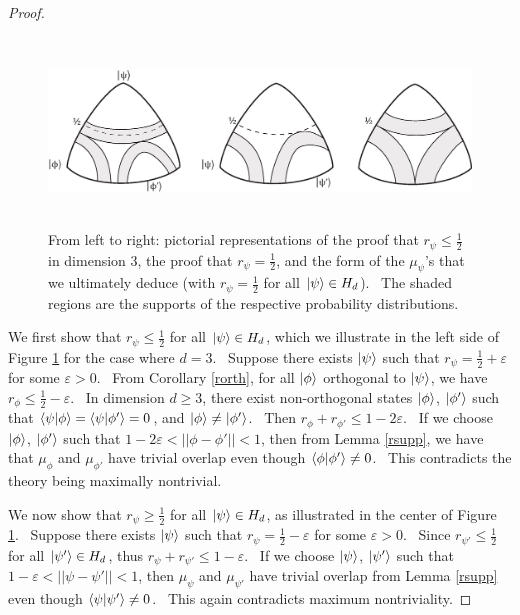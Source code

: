 \documentclass[letterpaper,11pt]{article}
\newcommand{\braket}[2]{\mbox{$ \langle #1 | #2 \rangle $}}
\newcommand{\ket}[1]{\mbox{$ | #1 \rangle $}}
\begin{document}
\begin{proof}
\begin{figure}[h] \centering
\includegraphics[height=5cm]{figlemma5}
\caption{From left to right: pictorial representations of the proof that $r_{\psi}\leq\frac{1}{2}$ in dimension $3$, the proof that $r_{\psi}=\frac{1}{2}$, and the form of the $\mu_{\psi}$'s that we ultimately deduce (with $r_{\psi}=\frac{1}{2}$ for all $\ket{\psi}\in H_d$). \ The shaded regions are the supports of the respective probability distributions.} \label{figlemma5}
\end{figure}
We first show that $r_{\psi}\leq \frac{1}{2}$ for all $\ket{\psi}\in H_d$, which we illustrate in the left side of Figure \ref{figlemma5} for the case where $d=3$. \ Suppose there exists $\ket{\psi}$ such that $r_{\psi}=\frac{1}{2}+\varepsilon$ for some $\varepsilon>0$. \ From Corollary \ref{rorth}, for all $\ket{\phi}$ orthogonal to $\ket{\psi}$, we have $r_{\phi}\leq \frac{1}{2}-\varepsilon$. \ In dimension $d\geq 3$, there exist non-orthogonal states $\ket{\phi}$, $\ket{\phi'}$ such that $\braket{\psi}{\phi}=\braket{\psi}{\phi'}=0$, and $\ket{\phi}\neq\ket{\phi'}$. \ Then $r_{\phi}+r_{\phi'}\leq 1-2\varepsilon$. \ If we choose $\ket{\phi}$, $\ket{\phi'}$ such that $1-2\varepsilon<||\phi-\phi'||<1$, then from Lemma \ref{rsupp}, we have that $\mu_{\phi}$ and $ \mu_{\phi'}$ have trivial overlap even though $\braket{\phi}{\phi'}\neq 0$. \ This contradicts the theory being maximally nontrivial.

We now show that $r_{\psi}\geq \frac{1}{2}$ for all $\ket{\psi}\in H_d$, as illustrated in the center of Figure \ref{figlemma5}. \ Suppose there exists $\ket{\psi}$ such that $r_{\psi}=\frac{1}{2}-\varepsilon$ for some $\varepsilon>0$. \ Since $r_{\psi'}\leq\frac{1}{2}$ for all $\ket{\psi'}\in H_d$, thus $r_{\psi}+r_{\psi'}\leq 1-\varepsilon$. \ If we choose $\ket{\psi}$, $\ket{\psi'}$ such that $1-\varepsilon < ||\psi-\psi'||<1$, then  $\mu_{\psi}$ and $ \mu_{\psi'}$ have trivial overlap from Lemma \ref{rsupp} even though $\braket{\psi}{\psi'}\neq 0$. \ This again contradicts maximum nontriviality.
\end{proof}
\end{document}
